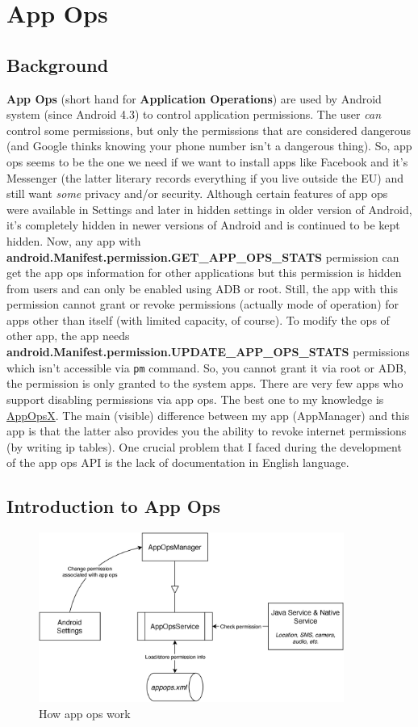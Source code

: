 \chapter{App Ops}\label{ch:app-ops}
\section{Background}\label{sec:app-ops-background}
\textbf{App Ops} (short hand for \textbf{Application Operations}) are used by Android system (since Android 4.3) to
control application permissions. The user \emph{can} control some permissions, but only the permissions that are considered
dangerous (and Google thinks knowing your phone number isn't a dangerous thing). So, app ops seems to be the one we need
if we want to install apps like Facebook and it's Messenger (the latter literary records everything if you live outside
the EU) and still want \emph{some} privacy and/or security. Although certain features of app ops were available in
Settings and later in hidden settings in older version of Android, it's completely hidden in newer versions of Android
and is continued to be kept hidden. Now, any app with \textbf{android.Manifest.permission.GET\_APP\_OPS\_STATS}
permission can get the app ops information for other applications but this permission is hidden from users and can only
be enabled using ADB or root. Still, the app with this permission cannot grant or revoke permissions (actually mode of
operation) for apps other than itself (with limited capacity, of course). To modify the ops of other app, the app needs
\textbf{android.Manifest.permission.UPDATE\_APP\_OPS\_STATS} permissions which isn't accessible via \texttt{pm} command.
So, you cannot grant it via root or ADB, the permission is only granted to the system apps. There are very few apps who
support disabling permissions via app ops. The best one to my knowledge is
\href{https://github.com/8enet/AppOpsX}{AppOpsX}. The main (visible) difference between my app (AppManager) and this
app is that the latter also provides you the ability to revoke internet permissions (by writing ip tables). One crucial
problem that I faced during the development of the app ops API is the lack of documentation in English language.

\section{Introduction to App Ops}\label{sec:introduction-to-app-ops}

\begin{figure}[ht]
    \centering
    \includegraphics[width=10cm]{./images/appops}
    \caption{How app ops work}
    \label{fig:appops}
\end{figure}

